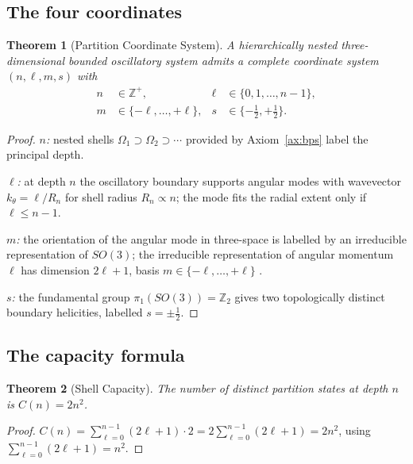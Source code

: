 \documentclass[twocolumn,10pt,a4paper]{article}
\theoremstyle{thmstyle}
\newtheorem{theorem}{Theorem}[section]
\theoremstyle{definition}
\theoremstyle{remark}
\newcommand{\Zp}{\mathbb{Z}^{+}}
\begin{document}
\subsection{The four coordinates}

\begin{theorem}[Partition Coordinate System]
\label{thm:nlms}
A hierarchically nested three-dimensional bounded oscillatory system
admits a complete coordinate system $(n,\ell,m,s)$ with
\begin{align*}
n&\in\Zp,&\ell&\in\{0,1,\ldots,n-1\},\\
m&\in\{-\ell,\ldots,+\ell\},& s&\in\{-\tfrac{1}{2},+\tfrac{1}{2}\}.
\end{align*}
\end{theorem}

\begin{proof}
\emph{$n$:} nested shells $\Omega_{1}\supset\Omega_{2}\supset\cdots$
provided by Axiom~\ref{ax:bps} label the principal depth.

\emph{$\ell$:} at depth $n$ the oscillatory boundary supports angular
modes with wavevector $k_{\theta}=\ell/R_{n}$ for shell radius
$R_{n}\propto n$; the mode fits the radial extent only if
$\ell\leq n-1$.

\emph{$m$:} the orientation of the angular mode in three-space is
labelled by an irreducible representation of $SO(3)$; the irreducible
representation of angular momentum $\ell$ has dimension $2\ell+1$,
basis $m\in\{-\ell,\ldots,+\ell\}$ \citep{hall2015}.

\emph{$s$:} the fundamental group $\pi_{1}(SO(3))=\mathbb{Z}_{2}$
\citep{nakahara2003} gives two topologically distinct boundary
helicities, labelled $s=\pm\tfrac{1}{2}$.
\end{proof}

\subsection{The capacity formula}

\begin{theorem}[Shell Capacity]
\label{thm:cap}
The number of distinct partition states at depth $n$ is
$C(n)=2n^{2}$.
\end{theorem}

\begin{proof}
$C(n)=\sum_{\ell=0}^{n-1}(2\ell+1)\cdot 2=2\sum_{\ell=0}^{n-1}(2\ell+1)
=2n^{2}$, using $\sum_{\ell=0}^{n-1}(2\ell+1)=n^{2}$.
\end{proof}
\end{document}
